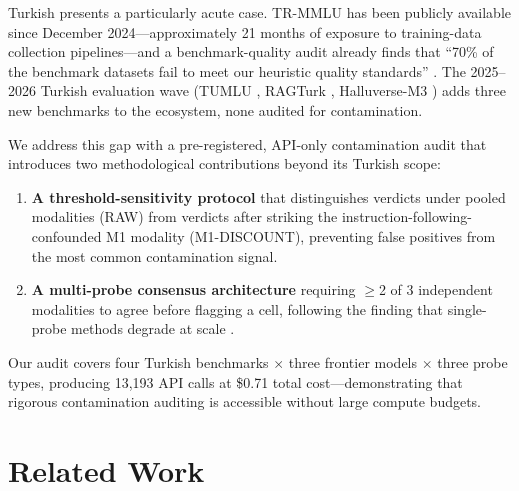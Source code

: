 \documentclass[letterpaper]{article}
\begin{document}
Turkish presents a particularly acute case. TR-MMLU \cite{trmmu2024} has been publicly available since December 2024---approximately 21 months of exposure to training-data collection pipelines---and a benchmark-quality audit already finds that ``70\% of the benchmark datasets fail to meet our heuristic quality standards'' \cite{yildiz2025evaluating}. The 2025--2026 Turkish evaluation wave (TUMLU \cite{tumlu2025}, RAGTurk \cite{ragturk2026}, Halluverse-M3 \cite{halluverse2026}) adds three new benchmarks to the ecosystem, none audited for contamination.

We address this gap with a pre-registered, API-only contamination audit that introduces two methodological contributions beyond its Turkish scope:
\begin{enumerate}
\item \textbf{A threshold-sensitivity protocol} that distinguishes verdicts under pooled modalities (RAW) from verdicts after striking the instruction-following-confounded M1 modality (M1-DISCOUNT), preventing false positives from the most common contamination signal.
\item \textbf{A multi-probe consensus architecture} requiring $\geq$2 of 3 independent modalities to agree before flagging a cell, following the finding that single-probe methods degrade at scale \cite{contamdetect2024}.
\end{enumerate}
Our audit covers four Turkish benchmarks $\times$ three frontier models $\times$ three probe types, producing 13,193 API calls at \$0.71 total cost---demonstrating that rigorous contamination auditing is accessible without large compute budgets.

\section{Related Work}
\end{document}
